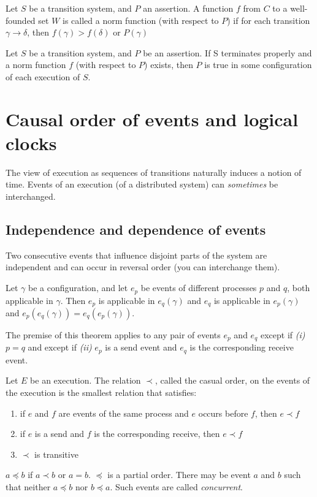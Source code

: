\begin{defi}
Let $S$ be a transition system, and $P$ an assertion. A function $f$ from $C$ to a well-founded set $W$ is called a norm function (with respect to $P$) if for each transition $\gamma \to \delta$, then $f(\gamma) > f(\delta)$ or $P(\gamma)$
\end{defi}

\begin{thm}
Let $S$ be a transition system, and $P$ be an assertion. If S terminates properly and a norm function $f$ (with respect to $P$) exists, then $P$ is true in some configuration of each execution of $S$.
\end{thm}


\section{Causal order of events and logical clocks}
The view of execution as sequences of transitions naturally induces a notion of time. Events of an execution (of a distributed system) can \emph{sometimes} be interchanged.

\subsection{Independence and dependence of events}
Two consecutive events that influence disjoint parts of the system are independent and can occur in reversal order (you can interchange them).

\begin{thm}
Let $\gamma$ be a configuration, and let $e_p$ be events of different processes $p$ and $q$, both applicable in $\gamma$. Then $e_p$ is applicable in $e_q(\gamma)$ and $e_q$ is applicable in $e_p(\gamma)$ and $e_p(e_q(\gamma))=e_q(e_p(\gamma))$.
\end{thm}

The premise of this theorem applies to any pair of events $e_p$ and $e_q$ except if \textit{(i)} $p=q$ and except if \textit{(ii)} $e_p$ is a send event and $e_q$ is the corresponding receive event.

\begin{defi}
Let $E$ be an execution. The relation $\prec$, called the casual order, on the events of the execution is the smallest relation that satisfies:
\begin{enumerate}
\item if $e$ and $f$ are events of the same process and $e$ occurs before $f$, then $e\prec f$
\item if $e$ is a send and $f$ is the corresponding receive, then $e \prec f$
\item $\prec$ is transitive
\end{enumerate}

$a\preceq b$ if $a\prec b$ or $a=b$. $\preceq$ is a partial order. There may be event $a$ and $b$ such that neither $a \preceq b$ nor $b\preceq a$. Such events are called \emph{concurrent}.
\end{defi}


